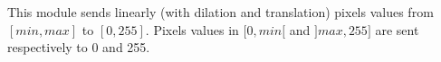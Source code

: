 This module sends linearly (with dilation and translation) 
pixels values from $[min,max]$ to $[0,255]$. 
\newline
Pixels values in $[ 0,min [$ and  $] max,255 ]$ are
sent respectively to 0 and 255.
